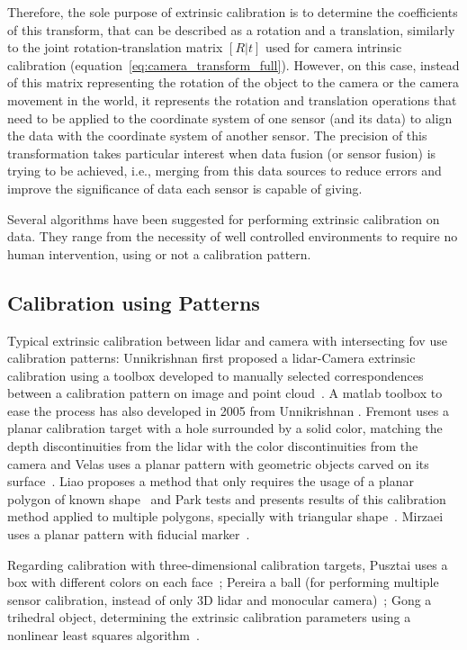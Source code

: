 Therefore, the sole purpose of extrinsic calibration is to determine the coefficients of this transform, that can be described as a rotation and a translation, similarly to the joint rotation-translation matrix $[R|t]$ used for camera intrinsic calibration (equation~\ref{eq:camera_transform_full}). However, on this case, instead of this matrix representing the rotation of the object to the camera or the camera movement in the world, it represents the rotation and translation operations that need to be applied to the coordinate system of one sensor (and its data) to align the data with the coordinate system of another sensor. The precision of this transformation takes particular interest when data fusion (or sensor fusion) is trying to be achieved, i.e., merging from this data sources to reduce errors and improve the significance of data each sensor is capable of giving. 

Several algorithms have been suggested for performing extrinsic calibration on data. They range from the necessity of well controlled environments to require no human intervention, using or not a calibration pattern. 


\subsection{Calibration using Patterns}
Typical extrinsic calibration between \ac{lidar} and camera with intersecting \ac{fov} use calibration patterns: Unnikrishnan first proposed a \ac{lidar}-Camera extrinsic calibration using a toolbox developed to manually selected correspondences between a calibration pattern on image and point cloud~\cite{Unnikrishnan2005}. A \ac{matlab} toolbox to ease the process has also developed in 2005 from Unnikrishnan \etal. Fremont \etal uses a planar calibration target with a hole surrounded by a solid color, matching the depth discontinuities from the \ac{lidar} with the color discontinuities from the camera \cite{Fremont2013} and Velas uses a planar pattern with geometric objects carved on its surface~\cite{MartinVelas2013}. Liao \etal proposes a method that only requires the usage of a planar polygon of known shape~\cite{Liao2019} and Park \etal tests and presents results of this calibration method applied to multiple polygons, specially with triangular shape~\cite{Park2014}. Mirzaei \etal uses a planar pattern with fiducial marker~\cite{Mirzaei2012}. 

Regarding calibration with three-dimensional calibration targets, Pusztai uses a box with different colors on each face~\cite{Pusztai2018}; Pereira a ball (for performing multiple sensor calibration, instead of only 3D \ac{lidar} and monocular camera)~\cite{Pereira2016}; Gong a trihedral object, determining the extrinsic calibration parameters using a nonlinear least squares algorithm~\cite{Gong2013}.

